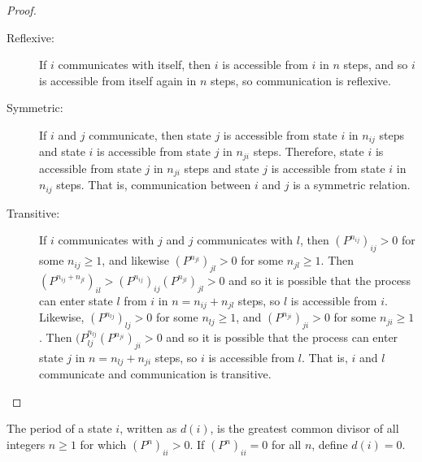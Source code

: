 \documentclass[12pt]{article}
\begin{document}
\begin{proof}
    \begin{description}
        \item[Reflexive:]
            If \( i \) communicates with itself, then \( i \) is
            accessible from \( i \) in \( n \) steps, and so \( i \) is
            accessible from itself again in \( n \) steps, so
            communication is reflexive.
        \item[Symmetric:]
            If \( i \) and \( j \) communicate, then state \( j \) is
            accessible from state \( i \) in \( n_{ij} \) steps and
            state \( i \) is accessible from state \( j \) in \( n_{ji} \)
            steps.  Therefore, state \( i \) is accessible from state \(
            j \) in \( n_{ji} \) steps and state \( j \) is accessible
            from state \( i \) in \( n_{ij} \) steps.  That is,
            communication between \( i \) and \( j \) is a symmetric
            relation.
        \item[Transitive:]
            If \( i \) communicates with \( j \) and \( j \)
            communicates with \( l \), then \( (P^{n_{ij}})_{ij} > 0 \)
            for some \( n_{ij} \ge 1 \), and likewise \( (P^{n_{jl}})_{jl}
            > 0 \) for some \( n_{jl} \ge 1 \).  Then \( (P^{n_{ij}+n_{jl}})_
            {il} > (P^{n_{ij}})_{ij}(P^{n_{jl}})_{jl} >0 \) and so it
            is possible that the process can enter state \( l \) from \(
            i \) in \( n = n_{ij} + n_{jl} \) steps, so \( l \) is
            accessible from \( i \).  Likewise, \( (P^{n_{lj}})_{lj} > 0
            \) for some \( n_{lj} \ge 1 \), and \( (P^{n_{ji}})_{ji} > 0
            \) for some \( n_{ji} \ge 1 \).  Then \( (P^{n_{lj}}_{lj} (P^
            {n_{ji}})_{ji} >0 \) and so it is possible that the process
            can enter state \( j \) in \( n = n_{lj} + n_{ji} \) steps,
            so \( i \) is accessible from \( l \). That is, \( i \) and \(
            l \) communicate and communication is transitive.
    \end{description}
\end{proof}

\begin{definition}
    The period of a state \( i \), written as \( d(i) \), is the
    greatest common divisor of all integers \( n \ge 1 \) for which \( (P^n)_
    {ii} > 0 \).  If \( (P^{n})_{ii} = 0 \) for all \( n \), define \( d
    (i) = 0 \).
\end{definition}
\end{document}
